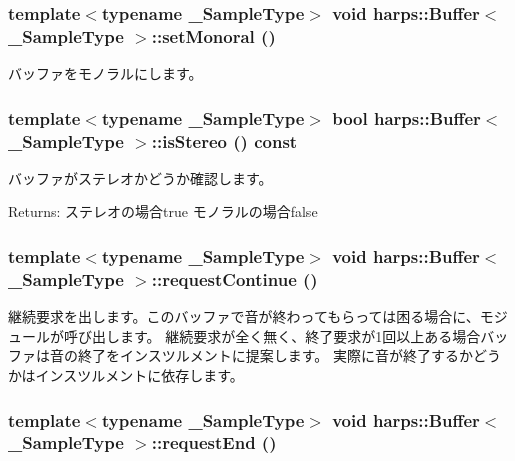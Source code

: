 \subsubsection[setMonoral]{\setlength{\rightskip}{0pt plus 5cm}template$<$typename \_\-SampleType$>$ void {\bf harps::Buffer}$<$ \_\-SampleType $>$::setMonoral ()\hspace{0.3cm}{\tt  [inline]}}\label{classharps_1_1Buffer_d64ce748ee70aaf027e30bc4ac23a641}


バッファをモノラルにします。 
\subsubsection[isStereo]{\setlength{\rightskip}{0pt plus 5cm}template$<$typename \_\-SampleType$>$ bool {\bf harps::Buffer}$<$ \_\-SampleType $>$::isStereo () const\hspace{0.3cm}{\tt  [inline]}}\label{classharps_1_1Buffer_aed1f9feac43f2110bc0345847259a2f}


バッファがステレオかどうか確認します。 \begin{Desc}
\item[Returns:]ステレオの場合true モノラルの場合false \end{Desc}
\subsubsection[requestContinue]{\setlength{\rightskip}{0pt plus 5cm}template$<$typename \_\-SampleType$>$ void {\bf harps::Buffer}$<$ \_\-SampleType $>$::requestContinue ()\hspace{0.3cm}{\tt  [inline]}}\label{classharps_1_1Buffer_c8c59a4b9026ae0db6029846305dfdb9}


継続要求を出します。このバッファで音が終わってもらっては困る場合に、モジュールが呼び出します。 継続要求が全く無く、終了要求が1回以上ある場合バッファは音の終了をインスツルメントに提案します。 実際に音が終了するかどうかはインスツルメントに依存します。 
\subsubsection[requestEnd]{\setlength{\rightskip}{0pt plus 5cm}template$<$typename \_\-SampleType$>$ void {\bf harps::Buffer}$<$ \_\-SampleType $>$::requestEnd ()\hspace{0.3cm}{\tt  [inline]}}\label{classharps_1_1Buffer_0975021873c9957e22944e210d0a6de9}



